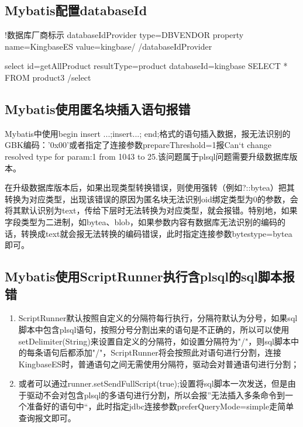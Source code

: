 \documentclass[a4,10pt,oneside,english]{sphinxmanual}
\begin{document}
\subsection{Mybatis配置databaseId}
\label{\detokenize{interface/mybatis:mybatisdatabaseid}}
\begin{sphinxVerbatim}[commandchars=\\\{\}]
\PYGZlt{}!\PYGZhy{}\PYGZhy{}数据库厂商标示 \PYGZhy{}\PYGZhy{}\PYGZgt{}
    \PYGZlt{}databaseIdProvider type=\PYGZdq{}DB\PYGZus{}VENDOR\PYGZdq{}\PYGZgt{}
        \PYGZlt{}property name=\PYGZdq{}KingbaseES\PYGZdq{} value=\PYGZdq{}kingbase\PYGZdq{}/\PYGZgt{}
    \PYGZlt{}/databaseIdProvider\PYGZgt{}

\PYGZlt{}select id=\PYGZdq{}getAllProduct\PYGZdq{} resultType=\PYGZdq{}product\PYGZdq{} databaseId=\PYGZdq{}kingbase\PYGZdq{}\PYGZgt{}
        SELECT * FROM product3
\PYGZlt{}/select\PYGZgt{}
\end{sphinxVerbatim}


\subsection{Mybatis使用匿名块插入语句报错}
\label{\detokenize{interface/mybatis:id2}}
Mybatis中使用begin insert ...;insert...; end;格式的语句插入数据，报无法识别的GBK编码：'0x00'或者指定了连接参数prepareThreshold=\sphinxhyphen{}1报Can‘t change resolved type for param:1 from 1043 to 25.该问题属于plsql问题需要升级数据库版本。

在升级数据库版本后，如果出现类型转换错误，则使用强转（例如?::bytea）把其转换为对应类型，出现该错误的原因为匿名块无法识别oid绑定类型为0的参数，会将其默认识别为text，传给下层时无法转换为对应类型，就会报错。特别地，如果字段类型为二进制，如bytea、blob，如果参数内容有数据库无法识别的编码的话，转换成text就会报无法转换的编码错误，此时指定连接参数bytestype=bytea即可。


\subsection{Mybatis使用ScriptRunner执行含plsql的sql脚本报错}
\label{\detokenize{interface/mybatis:mybatisscriptrunnerplsqlsql}}\begin{enumerate}
%
\item {} 
ScriptRunner默认按照自定义的分隔符每行执行，分隔符默认为分号，如果sql脚本中包含plsql语句，按照分号分割出来的语句是不正确的，所以可以使用setDelimiter(String)来设置自定义的分隔符，如设置分隔符为"/"，则sql脚本中的每条语句后都添加"/"，ScriptRunner将会按照此对语句进行分割，连接KingbaseES时，普通语句之间无需使用分隔符，驱动会对普通语句进行分割；

\item {} 
或者可以通过runner.setSendFullScript(true);设置将sql脚本一次发送，但是由于驱动不会对包含plsql的多语句进行分割，所以会报”无法插入多条命令到一个准备好的语句中“，此时指定jdbc连接参数preferQueryMode=simple走简单查询报文即可。

\end{enumerate}
\end{document}
